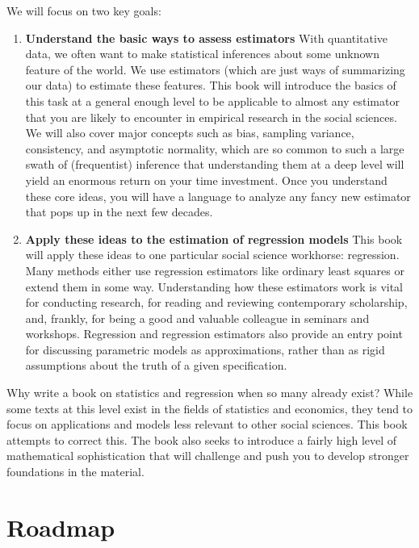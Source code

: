 \documentclass[
  13pt,
  letterpaper,
  DIV=11,
  numbers=noendperiod]{scrreprt}
\theoremstyle{plain}
\theoremstyle{definition}
\theoremstyle{definition}
\theoremstyle{remark}
\begin{document}
We will focus on two key goals:

\begin{enumerate}
\def\labelenumi{\arabic{enumi}.}
\item
  \textbf{Understand the basic ways to assess estimators} With
  quantitative data, we often want to make statistical inferences about
  some unknown feature of the world. We use estimators (which are just
  ways of summarizing our data) to estimate these features. This book
  will introduce the basics of this task at a general enough level to be
  applicable to almost any estimator that you are likely to encounter in
  empirical research in the social sciences. We will also cover major
  concepts such as bias, sampling variance, consistency, and asymptotic
  normality, which are so common to such a large swath of (frequentist)
  inference that understanding them at a deep level will yield an
  enormous return on your time investment. Once you understand these
  core ideas, you will have a language to analyze any fancy new
  estimator that pops up in the next few decades.
\item
  \textbf{Apply these ideas to the estimation of regression models} This
  book will apply these ideas to one particular social science
  workhorse: regression. Many methods either use regression estimators
  like ordinary least squares or extend them in some way. Understanding
  how these estimators work is vital for conducting research, for
  reading and reviewing contemporary scholarship, and, frankly, for
  being a good and valuable colleague in seminars and workshops.
  Regression and regression estimators also provide an entry point for
  discussing parametric models as approximations, rather than as rigid
  assumptions about the truth of a given specification.
\end{enumerate}

Why write a book on statistics and regression when so many already
exist? While some texts at this level exist in the fields of statistics
and economics, they tend to focus on applications and models less
relevant to other social sciences. This book attempts to correct this.
The book also seeks to introduce a fairly high level of mathematical
sophistication that will challenge and push you to develop stronger
foundations in the material.

\section*{Roadmap}\label{roadmap}
\end{document}
